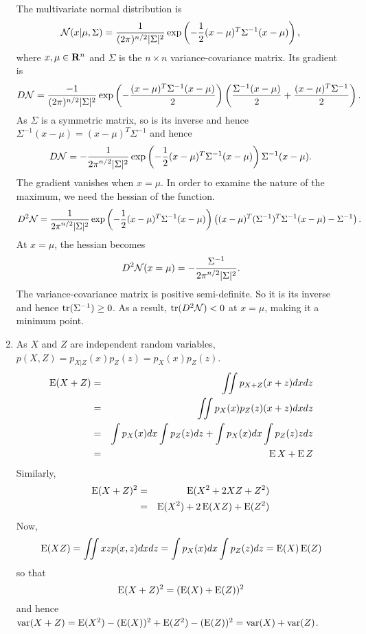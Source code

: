 \begin{enumerate}
The multivariate normal distribution is
\[
\mathcal{N}(x|\mu,\Sigma) = \frac{1}{(2\pi)^{n/2}\lvert\Sigma\rvert^2}\exp\left(-\frac{1}{2}(x - \mu)^T\Sigma^{-1}(x - \mu)\right),
\]
where $x, \mu \in \mathbf{R}^n$ and $\Sigma$ is the $n \times n$ variance-covariance matrix. Its gradient is
\[
D\mathcal{N} = \frac{-1}{(2\pi)^{n/2}\lvert\Sigma\rvert^2}\exp\left(-\frac{(x - \mu)^T\Sigma^{-1}(x - \mu)}{2}\right)\left(\frac{\Sigma^{-1}(x - \mu)}{2} + \frac{(x - \mu)^T\Sigma^{-1}}{2}\right).
\]
As $\Sigma$ is a symmetric matrix, so is its inverse and hence $\Sigma^{-1}(x - \mu) = (x - \mu)^T\Sigma^{-1}$ and hence
\[
D\mathcal{N} = -\frac{1}{{2\pi}^{n/2}\lvert\Sigma\rvert^2}\exp\left(-\frac{1}{2}(x - \mu)^T\Sigma^{-1}(x - \mu)\right)\Sigma^{-1}(x - \mu).
\]
The gradient vanishes when $x = \mu$. In order to examine the nature of the maximum, we need the
hessian of the function. 
\[
D^2\mathcal{N} = \frac{1}{{2\pi}^{n/2}\lvert\Sigma\rvert^2}\exp\left(-\frac{1}{2}(x - \mu)^T\Sigma^{-1}(x - \mu)\right)\left((x - \mu)^T(\Sigma^{-1})^T\Sigma^{-1}(x - \mu) - \Sigma^{-1}\right).
\]
At $x = \mu$, the hessian becomes
\[
D^2\mathcal{N}(x = \mu) = -\frac{\Sigma^{-1}}{{2\pi}^{n/2}\lvert\Sigma\rvert^2}.
\]
The variance-covariance matrix is positive semi-definite. So it is its inverse and hence $\operatorname{tr}(\Sigma^{-1}) \ge 0$.
As a result, $\operatorname{tr}(D^2\mathcal{N}) < 0$ at $x = \mu$, making it a minimum point.

\item As $X$ and $Z$ are independent random variables, $p(X, Z) = p_{X|Z}(x)p_Z(z) = p_X(x)p_Z(z)$. 
\begin{eqnarray*}
\operatorname{E}(X+Z) &=& \iint p_{X+Z}(x+z)dxdz \\
         &=& \iint p_X(x)p_Z(z)(x+z)dxdz \\
         &=& \int p_X(x)dx\int p_Z(z)dz + \int p_X(x)dx\int p_Z(z)zdz \\
         &=& \operatorname{E}{X} + \operatorname{E}{Z}
\end{eqnarray*}
Similarly,
\begin{eqnarray*}
\operatorname{E}(X+Z)^2 &=& \operatorname{E}(X^2 + 2XZ + Z^2) \\
           &=& \operatorname{E}(X^2) + 2\operatorname{E}(XZ) + \operatorname{E}(Z^2)
\end{eqnarray*}
Now,
\[
\operatorname{E}(XZ) = \iint xzp(x,z)dxdz = \int p_X(x)dx\int p_Z(z)dz = \operatorname{E}(X)\operatorname{E}(Z)
\]
so that
\[
\operatorname{E}(X+Z)^2 = (\operatorname{E}(X) + \operatorname{E}(Z))^2
\]
and hence $\operatorname{var}(X + Z) = \operatorname{E}(X^2) - (\operatorname{E}(X))^2 + \operatorname{E}(Z^2) - (\operatorname{E}(Z))^2 = \operatorname{var}(X) + \operatorname{var}(Z)$.


\end{enumerate}
